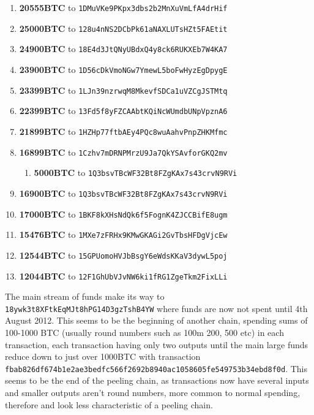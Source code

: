 \begin{enumerate}
    \item \textbf{20555BTC} to \texttt{1DMuVKe9PKpx3dbs2b2MnXuVmLfA4drHif}
    \item \textbf{25000BTC} to \texttt{128u4nNS2DCbPk61aNAXLUTsHZt5FAEtit}
    \item \textbf{24900BTC} to \texttt{18E4d3JtQNyUBdxQ4y8ck6RUKXEb7W4KA7}
    \item \textbf{23900BTC} to \texttt{1D56cDkVmoNGw7YmewL5boFwHyzEgDpygE}
    \item \textbf{23399BTC} to \texttt{1LJn39nzrwqM8MkevfSDCa1uVZCgJSTMtq}
    \item \textbf{22399BTC} to \texttt{13Fd5f8yFZCAAbtKQiNcWUmdbUNpVpznA6}
    \item \textbf{21899BTC} to \texttt{1HZHp77ftbAEy4PQc8wuAahvPnpZHKMfmc}
    \item \textbf{16899BTC} to \texttt{1Czhv7mDRNPMrzU9Ja7QkYSAvforGKQ2mv}
    \begin{enumerate}
        \item \textbf{5000BTC} to \texttt{1Q3bsvTBcWF32Bt8FZgKAx7s43crvN9RVi}
    \end{enumerate}
    \item \textbf{16900BTC} to \texttt{1Q3bsvTBcWF32Bt8FZgKAx7s43crvN9RVi}
    \item \textbf{17000BTC} to \texttt{1BKF8kXHsNdQk6f5FognK4ZJCCBifE8ugm}
    \item \textbf{15476BTC} to \texttt{1MXe7zFRHx9KMwGKAGi2GvTbsHFDgVjcEw}
    \item \textbf{12544BTC} to \texttt{15GPUomoHVJbBsgY6eWdsKKaV3dywL5poj}
    \item \textbf{12044BTC} to \texttt{12F1GhUbVJvNW6ki1fRG1ZgeTkm2FixLLi}
\end{enumerate}
The main stream of funds make its way to \texttt{18ywk3t8XFtkEqMJt8hPG14D3gzTshB4YW} where funds are now not spent until 4th August 2012. This seems to be the beginning of another chain, spending sums of 100-1000 BTC (usually round numbers such as 100m 200, 500 etc) in each transaction, each transaction having only two outputs until the main large funds reduce down to just over 1000BTC with transaction \\\texttt{fbab826df674b1e2ae3bedfc566f2692b8940ac1058605fe549753b34ebd8f0d}. This seems to be the end of the peeling chain, as transactions now have several inputs and smaller outputs aren't round numbers, more common to normal spending, therefore and look less characteristic of a peeling chain. 

